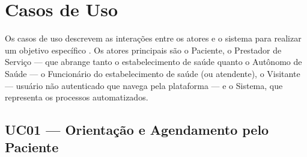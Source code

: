 \section{Casos de Uso}
\label{sec:use-cases}

Os casos de uso descrevem as interações entre os
atores e o sistema para realizar um objetivo
específico \cite{sommerville2011}. Os atores
principais são o Paciente, o Prestador de Serviço
--- que abrange tanto o estabelecimento de saúde quanto o Autônomo
de Saúde --- o Funcionário do estabelecimento de saúde (ou atendente),
o Visitante --- usuário não autenticado que navega
pela plataforma --- e o Sistema, que representa os
processos automatizados.

\subsection{UC01 --- Orientação e Agendamento pelo Paciente}
\label{subsec:uc01}


